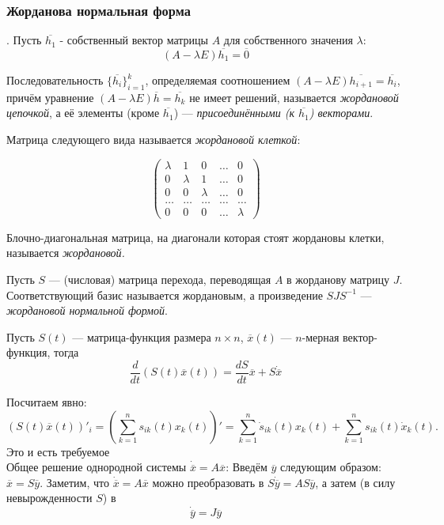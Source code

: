 \subsubsection*{Жорданова нормальная форма}

\Def. Пусть $\overline{h_1}$ - собственный вектор матрицы $A$ для собственного значения $\lambda$:
$$(A - \lambda E) \overline{h_1} = \overline{0}$$

Последовательность $\{\overline{h_i}\}^k_{i=1}$, определяемая соотношением $(A - \lambda E) \overline{h_{i+1}} = \overline{h_i}$, причём
уравнение $(A - \lambda E) \overline{h} = \overline{h_k}$ не имеет решений, называется \textit{жордановой цепочкой}, а её элементы (кроме $\overline{h_1}$) — \textit{присоединёнными (к $\overline{h_1}$) векторами}.

Матрица следующего вида называется \textit{жордановой клеткой}:

\begin{equation*}
\begin{pmatrix}
\lambda & 1 & 0 & \dots & 0\\
0 & \lambda & 1 & \dots & 0\\
0 & 0 & \lambda & \dots & 0\\
\dots & \dots & \dots & \dots & \dots\\
0 & 0 & 0 & \dots & \lambda
\end{pmatrix}
\end{equation*}

Блочно-диагональная матрица, на диагонали которая стоят жордановы клетки, называется \textit{жордановой.}

Пусть $S$ — (числовая) матрица перехода, переводящая $A$ в жорданову матрицу $J$. Соответствующий базис называется жордановым, а произведение $SJS^{-1}$ — \textit{жордановой нормальной формой}.

\Lemma Пусть $S(t)$ — матрица-функция размера $n \times n$, $\overline{x}(t)$ — $n$-мерная вектор-функция,
тогда
$$\frac{d}{dt}(S(t) \overline{x}(t)) = \frac{dS}{dt} \overline{x} + S \dot{\overline{x}}$$

\Proof 
Посчитаем явно:
\[(S(t) \overline{x}(t))'_i = \left( \sum_{k=1}^n s_{ik}(t) x_k(t) \right)' = \sum_{k=1}^n \dot{s}_{ik}(t) x_k(t) + \sum_{k=1}^n s_{ik}(t) \dot{x}_k(t).\]
Это и есть требуемое
\EndProof
\\

Общее решение однородной системы $\dot{\overline{x}} = A\overline{x}$: Введём $\overline{y}$ следующим образом: $\overline{x} = S\overline{y}$. Заметим, что $\dot{\overline{x}} = A\overline{x}$ можно преобразовать в $S \dot{\overline{y}} = AS\overline{y}$, а затем (в силу невырожденности $S$) в
$$\dot{\overline{y}} = J\overline{y}$$

